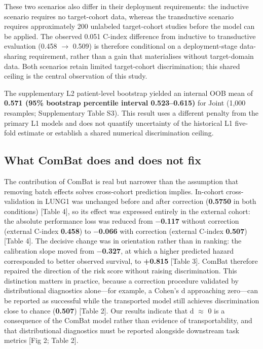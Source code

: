 \documentclass[a4paper,fleqn]{cas-sc}
\begin{document}
These two scenarios also differ in their deployment requirements: the inductive scenario requires no target-cohort data, whereas the transductive scenario requires approximately 200 unlabeled target-cohort studies before the model can be applied. The observed 0.051 C-index difference from inductive to transductive evaluation (0.458 $\rightarrow$ 0.509) is therefore conditional on a deployment-stage data-sharing requirement, rather than a gain that materialises without target-domain data. Both scenarios retain limited target-cohort discrimination; this shared ceiling is the central observation of this study.

The supplementary L2 patient-level bootstrap yielded an internal OOB mean of \textbf{0.571 (95\% bootstrap percentile interval 0.523--0.615)} for Joint (1,000 resamples; Supplementary Table S3). This result uses a different penalty from the primary L1 models and does not quantify uncertainty of the historical L1 five-fold estimate or establish a shared numerical discrimination ceiling.

\subsection{What ComBat does and does not fix}

The contribution of ComBat is real but narrower than the assumption that removing batch effects solves cross-cohort prediction implies. In-cohort cross-validation in LUNG1 was unchanged before and after correction (\textbf{0.5750} in both conditions) [Table 4], so its effect was expressed entirely in the external cohort: the absolute performance loss was reduced from \textbf{$-$0.117} without correction (external C-index \textbf{0.458}) to \textbf{$-$0.066} with correction (external C-index \textbf{0.507}) [Table 4]. The decisive change was in orientation rather than in ranking: the calibration slope moved from \textbf{$-$0.327}, at which a higher predicted hazard corresponded to better observed survival, to \textbf{+0.815} [Table 3]. ComBat therefore repaired the direction of the risk score without raising discrimination. This distinction matters in practice, because a correction procedure validated by distributional diagnostics alone---for example, a Cohen's d approaching zero---can be reported as successful while the transported model still achieves discrimination close to chance (\textbf{0.507}) [Table 2]. Our results indicate that d $\approx$ 0 is a consequence of the ComBat model rather than evidence of transportability, and that distributional diagnostics must be reported alongside downstream task metrics [Fig 2; Table 2].
\end{document}
